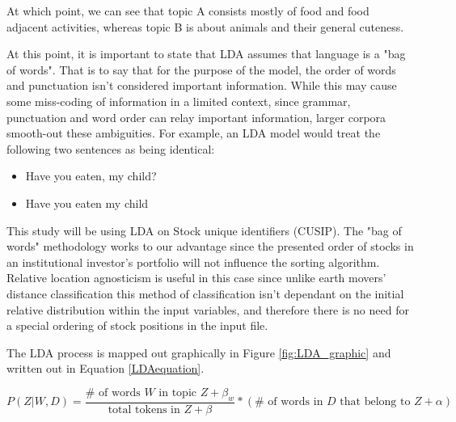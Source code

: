 At which point, we can see that topic A consists mostly of food and food adjacent activities, whereas topic B is about animals and their general cuteness. 

At this point, it is important to state that LDA assumes that language is a "bag of words". That is to say that for the purpose of the model, the order of words and punctuation isn't considered important information.  While this may cause some miss-coding of information in a limited context, since grammar, punctuation and word order can relay important information, larger corpora smooth-out these ambiguities. For example, an LDA model would treat the following two sentences as being identical:

\begin{itemize}	
	\item  Have you eaten, my child?
	
	\item  Have you eaten my child\textinterrobang 
\end{itemize}

This study will be using LDA on Stock unique identifiers (CUSIP). The "bag of words" methodology works to our advantage since the presented order of stocks in an institutional investor's portfolio will not influence the sorting algorithm. Relative location agnosticism is useful in this case since unlike earth movers' distance classification \citep{rubner2000earth} this method of classification isn't dependant on the initial relative distribution within the input variables, and therefore there is no need for a special ordering of stock positions in the input file.  


The LDA process is mapped out graphically in Figure \ref{fig:LDA_graphic} and written out in Equation \ref{LDAequation}. 


\begin{equation}
P(Z|W,D) = \dfrac{\# \text{ of words } W \text{ in topic } Z + \beta_{w}}{\text{total tokens in } Z + \beta}*(\# \text{ of words in } D \text{ that belong to } Z + \alpha)
\label{LDAequation}
\end{equation}



